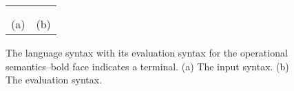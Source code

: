 \begin{lrbox}{\boxLangSyntax}
\begin{minipage}[c]{0.3\linewidth}
\cfgstart
{}
\cfgrule{\thread}{\lp\cfgnt{\cmd}~$\ldots$~$\bot$\rp}
\cfgrule{\cmd}{\lp\cfgt{\sendi}~\cfgt{\num}~\cfgt{\num}\rp}
   \cfgorline{\lp\cfgt{\recvi}~\cfgt{\aid}~\cfgt{\num}~\cfgt{\num}~\cfgt{\aid}\rp}
   \cfgorline{\lp\cfgt{\wait}~\cfgt{\aid}~\cfgt{\aid}\rp}
   \cfgorline{\lp\cfgt{\barrier}~\cfgt{\aid}\rp}
\cfgrule{\rcvp}{\lp\aid~$\ldots$\rp}
\cfgend
\end{minipage}
\end{lrbox}


\newsavebox{\boxEvalSyntax}
\begin{lrbox}{\boxEvalSyntax}
\begin{minipage}[c]{0.3\linewidth}
\cfgstart
{}
\cfgrule{\epsnd}{\cfgt{\mt}\
   \cfgor\lp\cfgnt{\epsnd}~\lb\lp\cfgt{\num},\cfgt{\num}\rp~$\rightarrow$~\cfgt{\num}\rb\rp}
\cfgrule{\eprcv}{\cfgt{\mt}\
   \cfgor\lp\cfgnt{\eprcv}~\lb\lp\cfgt{\num},\cfgt{\num}\rp~$\rightarrow$~\cfgt{\num}\rb\rp}
\cfgrule{rcv}{\lp\lb\cfgt{\aid}~\cfgt{\num}~\cfgt{\num}\rb\ \ldots\rp}
\cfgrule{\epbarrier}{\cfgt{\mt}\
   \cfgor\lp\cfgnt{\epbarrier}~\lb\cfgnt{\aid}~$\rightarrow$~\cfgt{\num}\rb\rp}
\cfgend
\end{minipage}
\end{lrbox}

\begin{figure}
\begin{center}
\setlength{\tabcolsep}{15pt}
\begin{tabular}{cc}
\scalebox{0.75}{\usebox{\boxLangSyntax}}
&
\scalebox{0.75}{\usebox{\boxEvalSyntax}}
\\ \\
(a) & (b)
\end{tabular}
\end{center}
\caption{The language syntax with its evaluation syntax for the operational semantics--bold face indicates a terminal. (a) The input syntax. (b) The evaluation syntax.}
\label{fig:expr:stx}
\end{figure}

